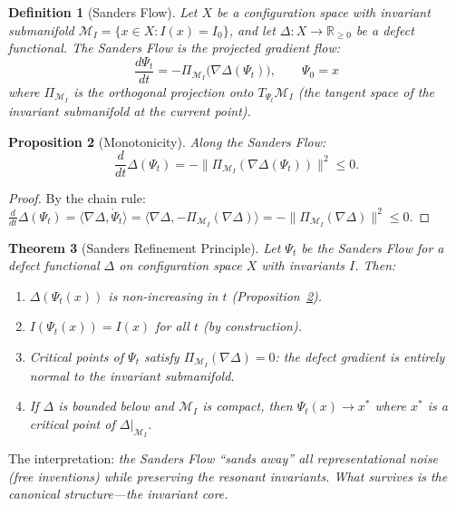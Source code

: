\documentclass[12pt, openany]{book}
\newtheorem{theorem}{Theorem}[chapter]
\newtheorem{proposition}[theorem]{Proposition}
\newtheorem{definition}[theorem]{Definition}
\theoremstyle{remark}
\begin{document}
\begin{definition}[Sanders Flow]\label{def:sanders-flow}
Let $X$ be a configuration space with invariant submanifold
$\mathcal{M}_I = \{x \in X : I(x) = I_0\}$, and let $\Delta : X \to \mathbb{R}_{\geq 0}$
be a defect functional. The \emph{Sanders Flow} is the projected gradient flow:
\[
  \boxed{\frac{d\Psi_t}{dt} = -\Pi_{\mathcal{M}_I}\!\bigl(\nabla \Delta(\Psi_t)\bigr), \qquad \Psi_0 = x}
\]
where $\Pi_{\mathcal{M}_I}$ is the orthogonal projection onto $T_{\Psi_t}\mathcal{M}_I$
(the tangent space of the invariant submanifold at the current point).
\end{definition}

\begin{proposition}[Monotonicity]\label{prop:sanders-mono}
Along the Sanders Flow:
\[
  \frac{d}{dt}\Delta(\Psi_t) = -\|\Pi_{\mathcal{M}_I}(\nabla\Delta(\Psi_t))\|^2 \leq 0.
\]
\end{proposition}

\begin{proof}
By the chain rule:
$\frac{d}{dt}\Delta(\Psi_t) = \langle \nabla\Delta, \dot{\Psi}_t \rangle
= \langle \nabla\Delta, -\Pi_{\mathcal{M}_I}(\nabla\Delta) \rangle
= -\|\Pi_{\mathcal{M}_I}(\nabla\Delta)\|^2 \leq 0$.
\end{proof}

\begin{theorem}[Sanders Refinement Principle]\label{thm:sanders-refine}
Let $\Psi_t$ be the Sanders Flow for a defect functional $\Delta$ on configuration
space $X$ with invariants $I$. Then:
\begin{enumerate}
  \item $\Delta(\Psi_t(x))$ is non-increasing in $t$ (Proposition~\ref{prop:sanders-mono}).
  \item $I(\Psi_t(x)) = I(x)$ for all $t$ (by construction).
  \item Critical points of $\Psi_t$ satisfy $\Pi_{\mathcal{M}_I}(\nabla\Delta) = 0$:
        the defect gradient is entirely normal to the invariant submanifold.
  \item If $\Delta$ is bounded below and $\mathcal{M}_I$ is compact, then
        $\Psi_t(x) \to x^*$ where $x^*$ is a critical point of $\Delta|_{\mathcal{M}_I}$.
\end{enumerate}
\end{theorem}

\noindent
The interpretation: \emph{the Sanders Flow ``sands away'' all representational noise
(free inventions) while preserving the resonant invariants.  What survives is the
canonical structure---the invariant core.}
\end{document}
